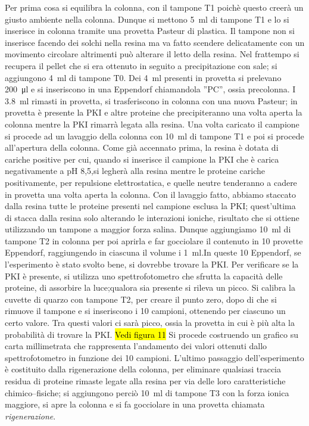 \documentclass[twocolumn,a4paper,10pt]{my_report}
\begin{document}
{Per prima cosa si equilibra la colonna, con il tampone T1 poichè questo creerà un giusto ambiente nella colonna.
Dunque si mettono \SI{5}{\ml} di tampone T1 e lo si inserisce in colonna tramite una provetta Pasteur di plastica. Il tampone non si inserisce facendo dei solchi nella resina ma va fatto scendere delicatamente con un movimento circolare altrimenti può alterare il letto della resina.
Nel frattempo si recupera il pellet che si era ottenuto in seguito a precipitazione con sale; si aggiungono \SI{4}{\ml} di tampone T0.
Dei \SI{4}{\ml} presenti in provetta si prelevano \SI{200}{\ul} e si inseriscono in una Eppendorf chiamandola ''PC'', ossia precolonna.
I \SI{3,8}{\ml} rimasti in provetta, si trasferiscono in colonna con una nuova Pasteur; in provetta è presente la PKI e altre proteine che precipiteranno una volta aperta la colonna mentre la PKI rimarrà legata alla resina. Una volta caricato il campione si procede ad un lavaggio della colonna con \SI{10}{\ml} di tampone T1 e poi si procede all'apertura della colonna.
Come già accennato prima, la resina è dotata di cariche positive per cui, quando si inserisce il campione la PKI che è carica negativamente a pH 8,5,si legherà alla resina mentre le proteine cariche positivamente, per repulsione elettrostatica, e quelle neutre tenderanno a cadere in provetta una volta aperta la colonna.
Con il lavaggio fatto, abbiamo staccato dalla resina tutte le proteine presenti nel campione esclusa la PKI; quest'ultima di stacca dalla resina solo alterando le interazioni ioniche, risultato che si ottiene utilizzando un tampone a maggior forza salina.
Dunque aggiungiamo \SI{10}{\ml} di tampone T2 in colonna per poi aprirla e far gocciolare il contenuto in 10 provette Eppendorf, raggiungendo in ciascuna il volume i \SI{1}{\ml}.In queste 10 Eppendorf, se l'esperimento è stato svolto bene, si dovrebbe trovare la PKI.
Per verificare se la PKI è presente, si utilizza uno spettrofotometro che sfrutta la capacità delle proteine, di assorbire la luce;qualora sia presente si rileva un picco.
Si calibra la cuvette di quarzo con tampone T2, per creare il punto zero, dopo di che si rimuove il tampone e si inseriscono i 10 campioni, ottenendo per ciascuno un certo valore.
Tra questi valori ci sarà picco, ossia la provetta in cui è più alta la probabilità di trovare la PKI. \hl{Vedi figura 11}
Si procede costruendo un grafico su carta millimetrata che rappresenta l'andamento dei valori ottenuti dallo spettrofotometro in funzione dei 10 campioni.
L'ultimo passaggio dell'esperimento è costituito dalla rigenerazione della colonna, per eliminare qualsiasi traccia residua di proteine rimaste legate alla resina per via delle loro caratteristiche chimico--fisiche; si aggiungono perciò \SI{10}{\ml} di tampone T3 con la forza ionica maggiore, si apre la colonna e si fa gocciolare in una provetta chiamata \emph{rigenerazione}.

}
\end{document}
